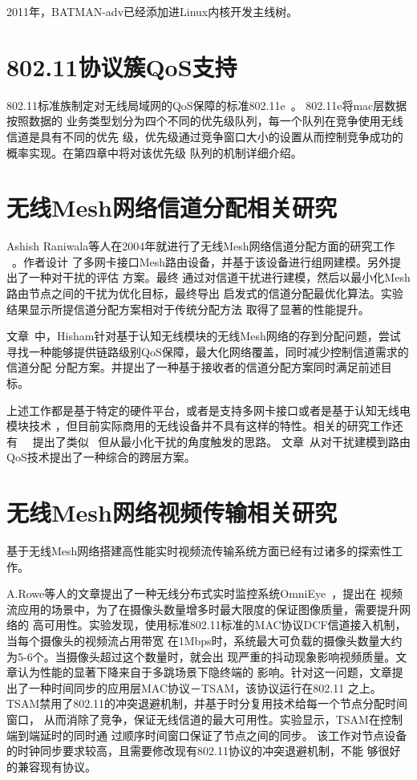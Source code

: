 2011年，BATMAN-adv已经添加进Linux内核开发主线树。

\section{802.11协议簇QoS支持}
802.11标准族制定对无线局域网的QoS保障的标准802.11e~\cite{IEEE80211e}。
802.11e将mac层数据按照数据的
业务类型划分为四个不同的优先级队列，每一个队列在竞争使用无线信道是具有不同的优先
级，优先级通过竞争窗口大小的设置从而控制竞争成功的概率实现。在第四章中将对该优先级
队列的机制详细介绍。

\section{无线Mesh网络信道分配相关研究}
Ashish Raniwala等人在2004年就进行了无线Mesh网络信道分配方面的研究工作
~\cite{multichannelassignment}。作者设计
了多网卡接口Mesh路由设备，并基于该设备进行组网建模。另外提出了一种对干扰的评估
方案。最终
通过对信道干扰进行建模，然后以最小化Mesh路由节点之间的干扰为优化目标，最终导出
启发式的信道分配最优化算法。实验结果显示所提信道分配方案相对于传统分配方法
取得了显著的性能提升。

文章~\cite{RBA}中，Hisham针对基于认知无线模块的无线Mesh网络的存到分配问题，尝试
寻找一种能够提供链路级别QoS保障，最大化网络覆盖，同时减少控制信道需求的信道分配
分配方案。并提出了一种基于接收者的信道分配方案同时满足前述目标。

上述工作都是基于特定的硬件平台，或者是支持多网卡接口或者是基于认知无线电模块技术
，但目前实际商用的无线设备并不具有这样的特性。相关的研究工作还有~\cite{2008minimum}
~\cite{2005characterizing}提出了类似~\cite{multichannelassignment}
但从最小化干扰的角度触发的思路。
文章~\cite{2005interference}从对干扰建模到路由QoS技术提出了一种综合的跨层方案。

\section{无线Mesh网络视频传输相关研究}
基于无线Mesh网络搭建高性能实时视频流传输系统方面已经有过诸多的探索性工作。

A.Rowe等人的文章提出了一种无线分布式实时监控系统OmniEye~\cite{OmniEye}，提出在
视频流应用的场景中，为了在摄像头数量增多时最大限度的保证图像质量，需要提升网络的
高可用性。实验发现，使用标准802.11标准的MAC协议DCF信道接入机制，
当每个摄像头的视频流占用带宽
在1Mbps时，系统最大可负载的摄像头数量大约为5-6个。当摄像头超过这个数量时，就会出
现严重的抖动现象影响视频质量。文章认为性能的显著下降来自于多跳场景下隐终端的
影响。针对这一问题，文章提出了一种时间同步的应用层MAC协议－TSAM，该协议运行在802.11
之上。TSAM禁用了802.11的冲突退避机制，并基于时分复用技术给每一个节点分配时间窗口，
从而消除了竞争，保证无线信道的最大可用性。实验显示，TSAM在控制端到端延时的同时通
过顺序时间窗口保证了节点之间的同步。
该工作对节点设备的时钟同步要求较高，且需要修改现有802.11协议的冲突退避机制，不能
够很好的兼容现有协议。

